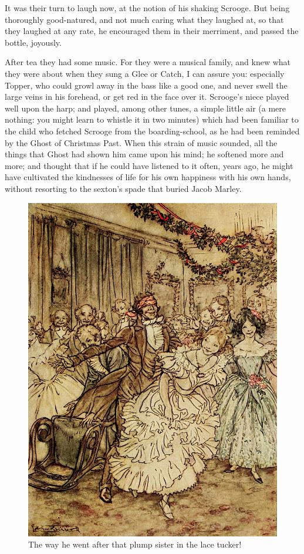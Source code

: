 \documentclass[paper=5.5in:8.5in,BCOR=10mm,twoside,DIV=15,12pt,usegeometry,openany]{scrbook} %
\begin{document}
It was their turn to laugh now, at the notion of his shaking Scrooge. But being thoroughly good-natured, and not much caring what they laughed at, so that they laughed at any rate, he encouraged them in their merriment, and passed the bottle, joyously.

After tea they had some music. For they were a musical family, and knew what they were about when they sung a Glee or Catch, I can assure you: especially Topper, who could growl away in the bass like a good one, and never swell the large veins in his forehead, or get red in the face over it. Scrooge's niece played well upon the harp; and played, among other tunes, a simple little air (a mere nothing: you might learn to whistle it in two minutes) which had been familiar to the child who fetched Scrooge from the boarding-school, as he had been reminded by the Ghost of Christmas Past. When this strain of music sounded, all the things that Ghost had shown him came upon his mind; he softened more and more; and thought that if he could have listened to it often, years ago, he might have cultivated the kindnesses of life for his own happiness with his own hands, without resorting to the sexton's spade that buried Jacob Marley.

\begin{figure}[p]
\begin{minipage}[c]{\linewidth}
\includegraphics[width=\linewidth]{fredpartyimproved}
\caption*{The way he went after that plump sister in the lace tucker!}
\end{minipage}
\end{figure}
\end{document}
